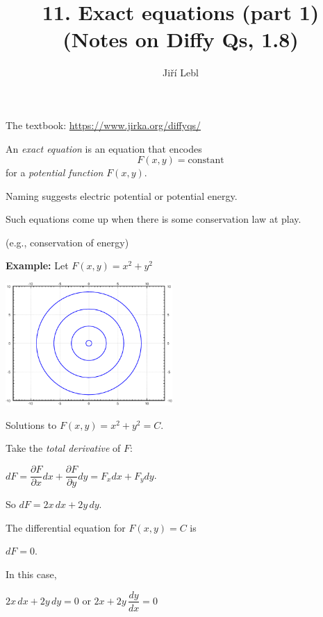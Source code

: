 \documentclass[10pt,aspectratio=169]{beamer}
\author{Ji\v{r}\'i Lebl}
\institute[OSU]{%
Oklahoma State University%
}
\title{11. Exact equations (part 1)\\(Notes on Diffy Qs, 1.8)}
\date{}
\begin{document}
\begin{frame}
\titlepage


\begin{center}
The textbook: \url{https://www.jirka.org/diffyqs/}
\end{center}
\end{frame}

\begin{frame}
An \emph{exact equation} is an equation that encodes 
\[
F(x,y) = \text{constant}
\]
for a \emph{potential function} $F(x,y)$.

\medskip
\pause

Naming suggests electric potential or potential energy.

\medskip
\pause

Such equations come up when there is some conservation
law at play.

(e.g., conservation of energy)

\end{frame}

\begin{frame}
\textbf{Example:}
Let $F(x,y) = x^2+y^2$

\vspace*{-\baselineskip}
\hspace*{3in}%
\includegraphics[width=2.5in]{../figures/circlesfig}

\hspace*{3in}%
Solutions to $F(x,y) = x^2+y^2 = C$.

\vspace*{-1.8in}

\pause

Take the
\emph{total derivative} of
$F$:

\medskip
\quad
$dF =
\dfrac{\partial F}{\partial x} dx + \dfrac{\partial F}{\partial y} dy
=
F_x dx + F_y dy
$.

\medskip
\pause
So
$dF = 2x \, dx + 2y \, dy$.

\medskip
\pause

The differential equation for
$F(x,y) = C$
is

\medskip

\quad $dF = 0$.

\medskip
\pause

In this case,

\medskip

\quad
$2x \, dx + 2y \, dy = 0$
\quad
or
\quad
$2x + 2y \, \dfrac{dy}{dx} = 0$
\end{frame}
\end{document}
